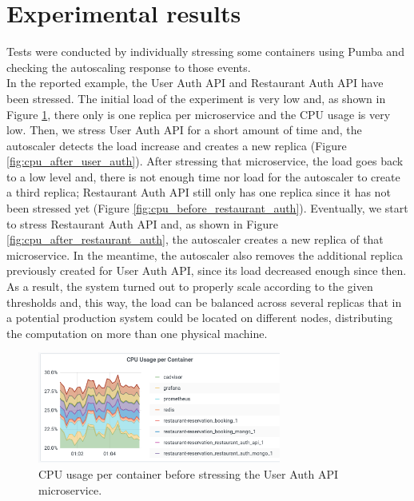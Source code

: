 \section{Experimental results}

Tests were conducted by individually stressing some containers using Pumba and
checking the autoscaling response to those events.\\
In the reported example, the User Auth API and Restaurant Auth API have been
stressed. The initial load of the experiment is very low and, as shown in Figure
\ref{fig:cpu_before_user_auth}, there only is one replica per microservice and the
CPU usage is very low. Then, we stress User Auth API for a short amount of time and,
the autoscaler detects the load increase and creates a new replica (Figure
\ref{fig:cpu_after_user_auth}). After stressing that microservice, the load goes back
to a low level and, there is not enough time nor load for the autoscaler to create a
third replica; Restaurant Auth API still only has one replica since it has not been
stressed yet (Figure \ref{fig:cpu_before_restaurant_auth}). Eventually, we start to
stress
Restaurant Auth API and, as shown in Figure \ref{fig:cpu_after_restaurant_auth},
the autoscaler creates a new replica of that microservice. In the meantime, the
autoscaler also removes the additional replica previously created for User Auth API,
since its load decreased enough since then.\\
As a result, the system turned out to properly scale according to the given thresholds
and, this way, the load can be balanced across several replicas that in a potential
production system could be located
on different nodes, distributing the computation on more than one physical machine.

\begin{figure}
    \begin{center}
        \includegraphics[width=8cm]{./images/cpu_before_user_auth.png}
    \end{center}
    \caption{CPU usage per container before stressing the User Auth API microservice.}
    \label{fig:cpu_before_user_auth}
\end{figure}

